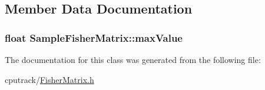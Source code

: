 \subsection{Member Data Documentation}
\subsubsection[{\texorpdfstring{max\+Value}{maxValue}}]{\setlength{\rightskip}{0pt plus 5cm}float Sample\+Fisher\+Matrix\+::max\+Value\hspace{0.3cm}{\ttfamily [private]}}\hypertarget{class_sample_fisher_matrix_a0d6faf2b816bcdaa5e85b78a9731b8d0}{}\label{class_sample_fisher_matrix_a0d6faf2b816bcdaa5e85b78a9731b8d0}


The documentation for this class was generated from the following file\+:\begin{DoxyCompactItemize}
\item 
cputrack/\hyperlink{_fisher_matrix_8h}{Fisher\+Matrix.\+h}\end{DoxyCompactItemize}
